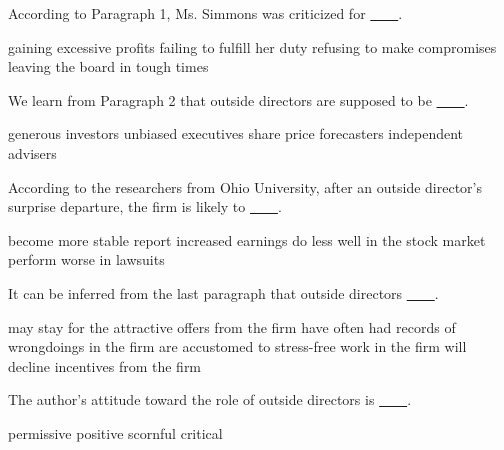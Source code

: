 \item According to Paragraph 1, Ms. Simmons was criticized for \uline{~~~~}.
\begin{tasks}
	\task gaining excessive profits
	\task failing to fulfill her duty
	\task refusing to make compromises
	\task leaving the board in tough times
\end{tasks}
\item We learn from Paragraph 2 that outside directors are supposed to be \uline{~~~~}.
\begin{tasks}
	\task generous investors
	\task unbiased executives
	\task share price forecasters
	\task independent advisers
\end{tasks}
\item According to the researchers from Ohio University, after an outside director's surprise departure, the firm is likely to \uline{~~~~}.
\begin{tasks}
	\task become more stable
	\task report increased earnings
	\task do less well in the stock market
	\task perform worse in lawsuits
\end{tasks}
\item It can be inferred from the last paragraph that outside directors \uline{~~~~}.
\begin{tasks}
	\task may stay for the attractive offers from the firm
	\task have often had records of wrongdoings in the firm
	\task are accustomed to stress-free work in the firm
	\task will decline incentives from the firm
\end{tasks}
\item The author's attitude toward the role of outside directors is \uline{~~~~}.
\begin{tasks}
	\task permissive
	\task positive
	\task scornful
	\task critical
\end{tasks}